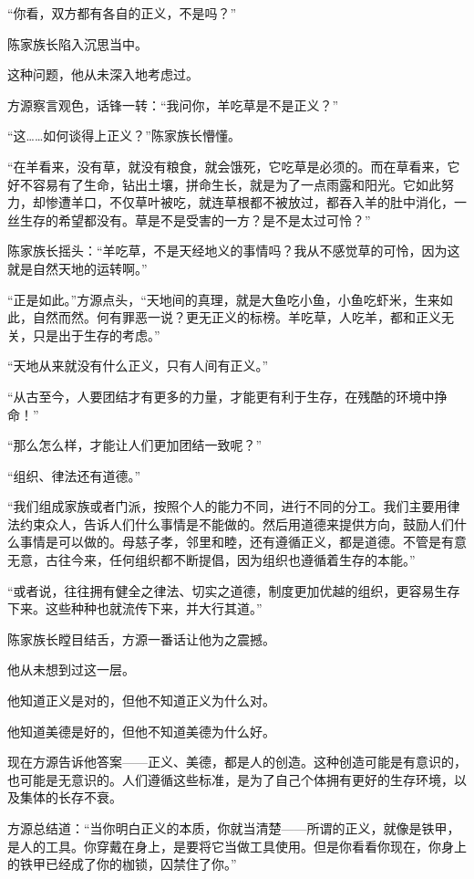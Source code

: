 \begin{this_body}
“你看，双方都有各自的正义，不是吗？”

陈家族长陷入沉思当中。

这种问题，他从未深入地考虑过。

方源察言观色，话锋一转：“我问你，羊吃草是不是正义？”

“这……如何谈得上正义？”陈家族长懵懂。

“在羊看来，没有草，就没有粮食，就会饿死，它吃草是必须的。而在草看来，它好不容易有了生命，钻出土壤，拼命生长，就是为了一点雨露和阳光。它如此努力，却惨遭羊口，不仅草叶被吃，就连草根都不被放过，都吞入羊的肚中消化，一丝生存的希望都没有。草是不是受害的一方？是不是太过可怜？”

陈家族长摇头：“羊吃草，不是天经地义的事情吗？我从不感觉草的可怜，因为这就是自然天地的运转啊。”

“正是如此。”方源点头，“天地间的真理，就是大鱼吃小鱼，小鱼吃虾米，生来如此，自然而然。何有罪恶一说？更无正义的标榜。羊吃草，人吃羊，都和正义无关，只是出于生存的考虑。”

“天地从来就没有什么正义，只有人间有正义。”

“从古至今，人要团结才有更多的力量，才能更有利于生存，在残酷的环境中挣命！”

“那么怎么样，才能让人们更加团结一致呢？”

“组织、律法还有道德。”

“我们组成家族或者门派，按照个人的能力不同，进行不同的分工。我们主要用律法约束众人，告诉人们什么事情是不能做的。然后用道德来提供方向，鼓励人们什么事情是可以做的。母慈子孝，邻里和睦，还有遵循正义，都是道德。不管是有意无意，古往今来，任何组织都不断提倡，因为组织也遵循着生存的本能。”

“或者说，往往拥有健全之律法、切实之道德，制度更加优越的组织，更容易生存下来。这些种种也就流传下来，并大行其道。”

陈家族长瞠目结舌，方源一番话让他为之震撼。

他从未想到过这一层。

他知道正义是对的，但他不知道正义为什么对。

他知道美德是好的，但他不知道美德为什么好。

现在方源告诉他答案——正义、美德，都是人的创造。这种创造可能是有意识的，也可能是无意识的。人们遵循这些标准，是为了自己个体拥有更好的生存环境，以及集体的长存不衰。

方源总结道：“当你明白正义的本质，你就当清楚——所谓的正义，就像是铁甲，是人的工具。你穿戴在身上，是要将它当做工具使用。但是你看看你现在，你身上的铁甲已经成了你的枷锁，囚禁住了你。”


\end{this_body}
